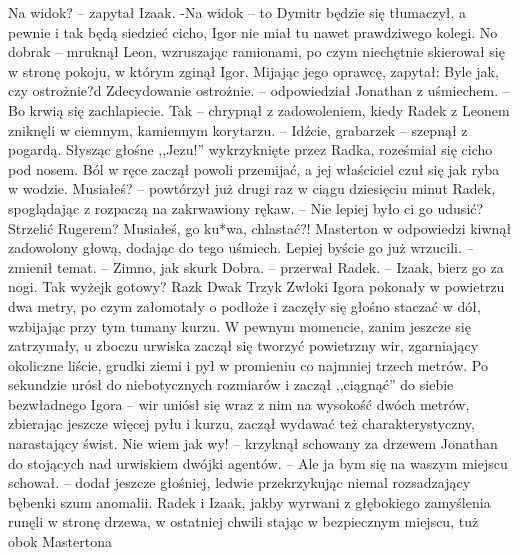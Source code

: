 \documentclass[../MAIN.tex]{subfiles}
\begin{document}
\xx Na widok? -- zapytał Izaak.
-Na widok -- to Dymitr będzie się tłumaczył, a pewnie i tak będą siedzieć cicho, Igor nie miał tu nawet prawdziwego kolegi.
\xx No dobra\3k -- mruknął Leon, wzruszając ramionami, po czym niechętnie skierował się w stronę pokoju, w którym zginął Igor. Mijając jego oprawcę, zapytał:
\xx Byle jak, czy ostrożnie?d
\xx Zdecydowanie ostrożnie. -- odpowiedział Jonathan z uśmiechem. -- Bo krwią się zachlapiecie. Ta\3k -- chrypnął z zadowoleniem, kiedy Radek z Leonem zniknęli w ciemnym, kamiennym korytarzu. -- Idźcie, grabarze\3k -- szepnął z pogardą.
\qd
Słysząc głośne ,,Jezu!'' wykrzyknięte przez Radka, roześmiał się cicho pod nosem. Ból w ręce zaczął powoli przemijać, a jej właściciel czuł się jak ryba w wodzie.
\sx Musiałeś? -- powtórzył już drugi raz w ciągu dziesięciu minut Radek, spoglądając z rozpaczą na zakrwawiony rękaw. -- Nie lepiej było ci go udusić? Strzelić Rugerem? Musiałeś, go ku*wa, chlastać?!
\qd
Masterton w odpowiedzi kiwnął zadowolony głową, dodając do tego uśmiech.
\sx Lepiej byście go już wrzucili. -- zmienił temat. -- Zimno, jak skur\3k
\xx Dobra. -- przerwał Radek. -- Izaak, bierz go za nogi. Ta\3k wyżej\3k gotowy?
\xx Raz\3k
\xx Dwa\3k
\xx Trzy\3k
\qd
Zwłoki Igora pokonały w powietrzu dwa metry, po czym załomotały o podłoże i zaczęły się głośno staczać w dół, wzbijając przy tym tumany kurzu. W pewnym momencie, zanim jeszcze się zatrzymały, u zboczu urwiska zaczął się tworzyć powietrzny wir, zgarniający okoliczne liście, grudki ziemi i pył w promieniu co najmniej trzech metrów. Po sekundzie urósł do niebotycznych rozmiarów i zaczął ,,ciągnąć'' do siebie bezwładnego Igora -- wir uniósł się wraz z nim na wysokość dwóch metrów, zbierając jeszcze więcej pyłu i kurzu, zaczął wydawać też charakterystyczny, narastający świst.
\sx Nie wiem jak wy! -- krzyknął schowany za drzewem Jonathan do stojących nad urwiskiem dwójki agentów. -- Ale ja bym się na waszym miejscu schował. -- dodał jeszcze głośniej, ledwie przekrzykując niemal rozsadzający bębenki szum anomalii.
\qd
Radek i Izaak, jakby wyrwani z głębokiego zamyślenia runęli w stronę drzewa, w ostatniej chwili stając w bezpiecznym miejscu, tuż obok Mastertona
\end{document}
